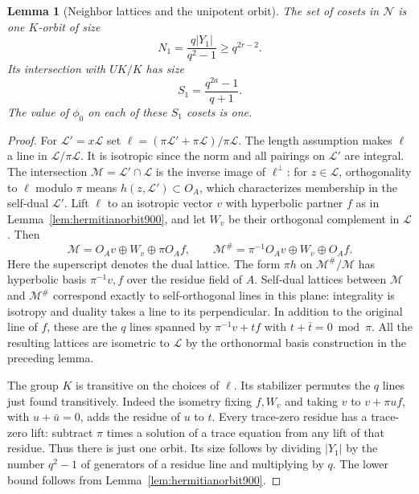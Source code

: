 \documentclass[a4paper,11pt]{article}
\newtheorem{lemma}[proposition]{Lemma}
\theoremstyle{definition}
\theoremstyle{remark}
\numberwithin{equation}{section}
\begin{document}
\begin{lemma}[Neighbor lattices and the unipotent orbit]
\leavevmode\label{lem:inertneighbor901}
The set of cosets in \(\mathcal N\) is one \(K\)-orbit of size
\[
      N_1=\frac{q|Y_1|}{q^2-1}\ge q^{2r-2}.
\]
Its intersection with \(UK/K\) has size
\[
                       S_1=\frac{q^{2a}-1}{q+1}.
\]
The value of \(\phi_0\) on each of these \(S_1\) cosets is one.
\end{lemma}
\begin{proof}
For \(\mathcal L'=x\mathcal L\) set
\(\ell=(\pi\mathcal L'+\pi\mathcal L)/\pi\mathcal L\).
The length assumption makes \(\ell\) a line in
\(\mathcal L/\pi\mathcal L\). It is isotropic since the norm and
all pairings on \(\mathcal L'\) are integral. The intersection
\(\mathcal M=\mathcal L'\cap\mathcal L\) is the inverse image
of \(\ell^\perp\): for \(z\in\mathcal L\), orthogonality to \(\ell\)
modulo \(\pi\) means \(h(z,\mathcal L')\subset O_A\), which
characterizes membership in the self-dual \(\mathcal L'\).
Lift \(\ell\) to an isotropic vector \(v\) with hyperbolic
partner \(f\) as in Lemma~\ref{lem:hermitianorbit900}, and
let \(W_v\) be their orthogonal complement in \(\mathcal L\).
Then
\[
 \mathcal M=O_Av\oplus W_v\oplus\pi O_A f,\qquad
 \mathcal M^\#=\pi^{-1}O_Av\oplus W_v\oplus O_A f .
\]
Here the superscript denotes the dual lattice. The form \(\pi h\)
on \(\mathcal M^\#/\mathcal M\) has hyperbolic basis
\(\pi^{-1}v,f\) over the residue field of \(A\). Self-dual lattices
between \(\mathcal M\) and \(\mathcal M^\#\) correspond exactly
to self-orthogonal lines in this plane: integrality is isotropy
and duality takes a line to its perpendicular. In addition to
the original line of \(f\), these are the \(q\) lines spanned by
\(\pi^{-1}v+t f\) with \(t+\bar t=0\bmod\pi\).
All the resulting lattices are isometric to \(\mathcal L\)
by the orthonormal basis construction in the preceding lemma.

The group \(K\) is transitive on the choices of \(\ell\). Its
stabilizer permutes the \(q\) lines just found transitively.
Indeed the isometry fixing \(f,W_v\) and taking
\(v\) to \(v+\pi u f\), with \(u+\bar u=0\), adds the residue of
\(u\) to \(t\). Every trace-zero residue has a trace-zero lift:
subtract \(\pi\) times a solution of a trace equation from
any lift of that residue. Thus there is just one orbit.
Its size follows by dividing \(|Y_1|\) by the number \(q^2-1\)
of generators of a residue line and multiplying by \(q\).
The lower bound follows from Lemma~\ref{lem:hermitianorbit900}.


\end{proof}
\end{document}
